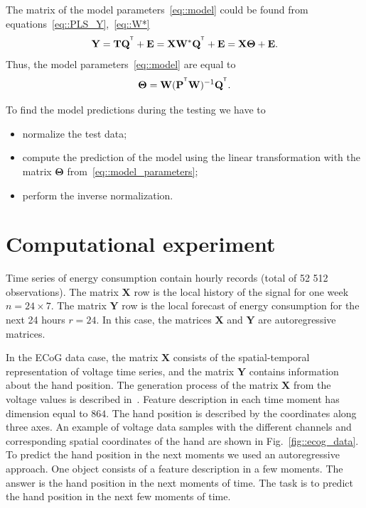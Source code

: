 \documentclass[preprint,12pt]{elsarticle}
\newcommand{\bY}{\mathbf{Y}}
\newcommand{\bX}{\mathbf{X}}
\newcommand{\bP}{\mathbf{P}}
\newcommand{\bT}{\mathbf{T}}
\newcommand{\bQ}{\mathbf{Q}}
\newcommand{\bE}{\mathbf{E}}
\newcommand{\bW}{\mathbf{W}}
\newcommand{\bTheta}{\boldsymbol{\Theta}}
\newcommand{\T}{^{\text{\tiny\sffamily\upshape\mdseries T}}}
\begin{document}
The matrix of the model parameters~\ref{eq::model} could be found from equations~\eqref{eq::PLS_Y},~\eqref{eq::W*}
\begin{equation*}
\bY = \bT \bQ^{\T} + \bE = \bX \bW^* \bQ^{\T} + \bE = \bX \bTheta + \bE.
\end{equation*}
Thus, the model parameters~\eqref{eq::model} are equal to
\begin{equation}
\bTheta = \bW (\bP^{\T} \bW)^{-1} \bQ^{\T}.
\label{eq::model_parameters}
\end{equation}

To find the model predictions during the testing we have to
\begin{itemize}
	\item normalize the test data;
	\item compute the prediction of the model using the linear transformation with the matrix $\bTheta$ from~\eqref{eq::model_parameters};
	\item perform the inverse normalization.
\end{itemize}

\section{Computational experiment}
\label{sec:exper}

Time series of energy consumption contain hourly records (total of 52 512 observations). 
The matrix $\bX$ row is the local history of the signal for one week $n = 24 \times 7$. 
The matrix $\bY$ row is the local forecast of energy consumption for the next 24 hours $r = 24$. 
In this case, the matrices $\bX$ and $\bY$ are autoregressive matrices.

In the ECoG data case, the matrix $\bX$ consists of the spatial-temporal representation of voltage time series, and the matrix $\bY$ contains information about the hand position.
The generation process of the matrix $\bX$ from the voltage values is described in~\cite{gasanov2017pls}. 
Feature description in each time moment has dimension equal to $864$. The hand position is described by the coordinates along three axes. 
An example of voltage data samples with the different channels and corresponding spatial coordinates of the hand are shown in Fig.~\ref{fig::ecog_data}.
To predict the hand position in the next moments we used an autoregressive approach.
One object consists of a feature description in a few moments. 
The answer is the hand position in the next moments of time.
The task is to predict the hand position in the next few moments of time.
\end{document}

